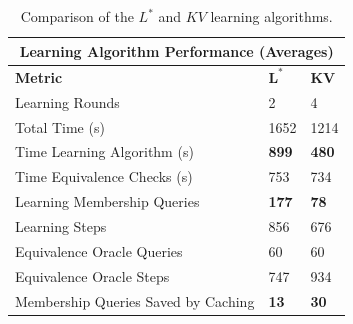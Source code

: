\begin{table}[h]
	\centering
	\begin{tabular}{ |p{6.5cm}||p{1cm}|p{1cm}|  }
		\hline
		\multicolumn{3}{|c|}{\textbf{Learning Algorithm Performance (Averages)}} \\
		\hline
		\textbf{Metric} & $\mathbf{L^*}$ & $\mathbf{KV}$ \\
		\hline
		Learning Rounds							&	2				&	4 				\\
		Total Time (s)							&   1652			& 	1214   			\\
		Time Learning Algorithm	(s)				&	\textbf{899}	& 	\textbf{480}	\\
		Time Equivalence Checks (s)				& 	753				& 	734			\\
		Learning Membership Queries 			&   \textbf{177}	& 	\textbf{78}		\\
		Learning Steps							& 	856	  			& 	676   			\\
		Equivalence Oracle Queries				& 	60  			&  	60				\\
		Equivalence Oracle Steps				& 	747  			&  	934				\\
		Membership Queries Saved by Caching		& 	\textbf{13}		&  	\textbf{30}				\\
		\hline
	\end{tabular}
	\caption{Comparison of the $L^*$ and $KV$ learning algorithms.}
	\label{tab:compkvlstar}
\end{table}
\newpage

